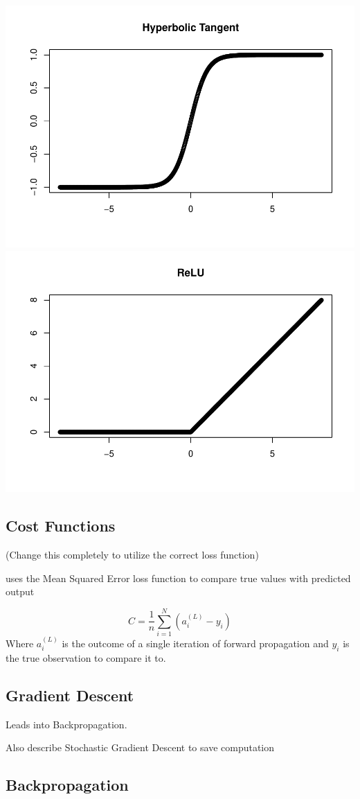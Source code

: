 \includegraphics[width=0.5\linewidth]{ANN_files/figures-side-1}
\includegraphics[width=0.5\linewidth]{ANN_files/figures-side-2}

\hypertarget{cost-functions}{%
\subsection{Cost Functions}\label{cost-functions}}

(Change this completely to utilize the correct loss function)

uses the Mean Squared Error loss function to compare true values with
predicted output

\[
C = \frac{1}{n} \sum_{i=1}^N (a^{(L)}_i - y_i)
\] Where \(a^{(L)}_i\) is the outcome of a single iteration of forward
propagation and \(y_i\) is the true observation to compare it to.

\hypertarget{gradient-descent}{%
\subsection{Gradient Descent}\label{gradient-descent}}

Leads into Backpropagation.

Also describe Stochastic Gradient Descent to save computation

\hypertarget{backpropagation}{%
\subsection{Backpropagation}\label{backpropagation}}

